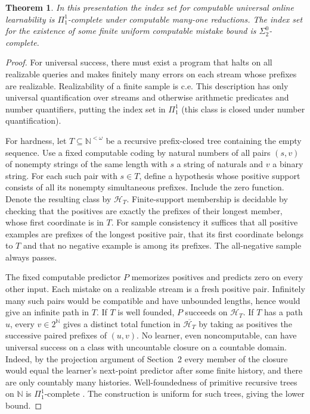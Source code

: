 \documentclass[11pt]{article}
\newtheorem{theorem}{Theorem}
\newcommand{\N}{\mathbb N}
\newcommand{\HH}{\mathcal H}
\begin{document}
\begin{theorem}\label{indices}
In this presentation the index set for computable universal online learnability is $\Pi^1_1$-complete under computable many-one reductions. The index set for the existence of some finite uniform computable mistake bound is $\Sigma^0_2$-complete.
\end{theorem}
\begin{proof}
For universal success, there must exist a program that halts on all realizable queries and makes finitely many errors on each stream whose prefixes are realizable. Realizability of a finite sample is c.e. This description has only universal quantification over streams and otherwise arithmetic predicates and number quantifiers, putting the index set in $\Pi^1_1$ (this class is closed under number quantification).

For hardness, let $T\subseteq\N^{<\omega}$ be a recursive prefix-closed tree containing the empty sequence. Use a fixed computable coding by natural numbers of all pairs $(s,v)$ of nonempty strings of the same length with $s$ a string of naturals and $v$ a binary string. For each such pair with $s\in T$, define a hypothesis whose positive support consists of all its nonempty simultaneous prefixes. Include the zero function. Denote the resulting class by $\HH_T$. Finite-support membership is decidable by checking that the positives are exactly the prefixes of their longest member, whose first coordinate is in $T$. For sample consistency it suffices that all positive examples are prefixes of the longest positive pair, that its first coordinate belongs to $T$ and that no negative example is among its prefixes. The all-negative sample always passes.

The fixed computable predictor $P$ memorizes positives and predicts zero on every other input. Each mistake on a realizable stream is a fresh positive pair. Infinitely many such pairs would be compatible and have unbounded lengths, hence would give an infinite path in $T$. If $T$ is well founded, $P$ succeeds on $\HH_T$. If $T$ has a path $u$, every $v\in 2^\N$ gives a distinct total function in $\overline{\HH_T}$ by taking as positives the successive paired prefixes of $(u,v)$. No learner, even noncomputable, can have universal success on a class with uncountable closure on a countable domain. Indeed, by the projection argument of Section~2 every member of the closure would equal the learner's next-point predictor after some finite history, and there are only countably many histories. Well-foundedness of primitive recursive trees on $\N$ is $\Pi^1_1$-complete \cite{sacks}. The construction is uniform for such trees, giving the lower bound.


\end{proof}
\end{document}
